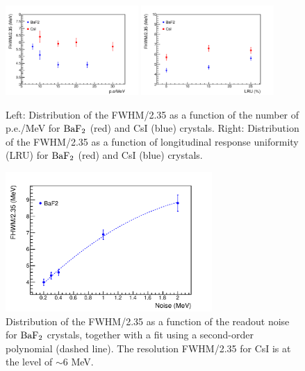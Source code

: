 \begin{figure}[htb]
\begin{center}
   \includegraphics[width=0.45\textwidth]{Figures/npe.pdf}
   \includegraphics[width=0.45\textwidth]{Figures/lru.pdf}
\end{center}
\caption
{Left: Distribution of the FWHM/2.35 as a function of the number of p.e./MeV for $\rm BaF_2$ (red) and CsI (blue) crystals. 
Right: Distribution of the FWHM/2.35 as a function of longitudinal response uniformity (LRU) for $\rm BaF_2$ (red) and 
CsI (blue) crystals.}
\label{sim::fig::param}
\end{figure}


\begin{figure}[htb]
\begin{center}
   \includegraphics[width=0.7\textwidth]{Figures/noise.pdf}
\end{center}
\caption
{Distribution of the FWHM/2.35 as a function of the readout noise for $\rm BaF_2$ crystals, together with a fit using a 
second-order polynomial (dashed line). The resolution FWHM/2.35 for CsI is at the level of $\sim 6$ MeV. }
\label{sim::fig::param2}
\end{figure}



